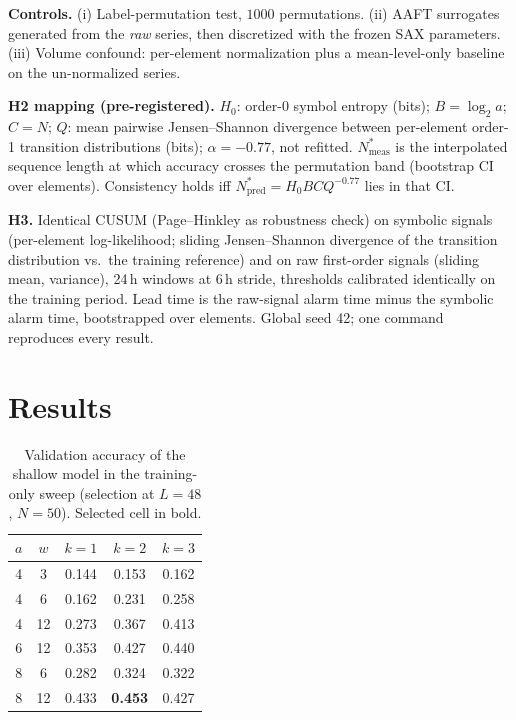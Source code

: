 \documentclass[conference]{IEEEtran}
\begin{document}
\textbf{Controls.} (i) Label-permutation test, $1000$ permutations. (ii) AAFT
surrogates generated from the \emph{raw} series, then discretized with the
frozen SAX parameters. (iii) Volume confound: per-element normalization plus a
mean-level-only baseline on the un-normalized series.

\textbf{H2 mapping (pre-registered).} $H_0$: order-0 symbol entropy (bits);
$B=\log_2 a$; $C=N$; $Q$: mean pairwise Jensen--Shannon divergence between
per-element order-1 transition distributions (bits); $\alpha=-0.77$, not
refitted. $N^\ast_{\text{meas}}$ is the interpolated sequence length at which
accuracy crosses the permutation band (bootstrap CI over elements). Consistency
holds iff $N^\ast_{\text{pred}}=H_0 B C Q^{-0.77}$ lies in that CI.

\textbf{H3.} Identical CUSUM (Page--Hinkley as robustness check) on symbolic
signals (per-element log-likelihood; sliding Jensen--Shannon divergence of the
transition distribution vs.\ the training reference) and on raw first-order
signals (sliding mean, variance), 24\,h windows at 6\,h stride, thresholds
calibrated identically on the training period. Lead time is the raw-signal
alarm time minus the symbolic alarm time, bootstrapped over elements. Global
seed 42; one command reproduces every result.

\section{Results}\label{sec:results}

\begin{table}[t]
\caption{Validation accuracy of the shallow model in the training-only sweep
(selection at $L{=}48$, $N{=}50$). Selected cell in bold.}
\label{tab:sweep}
\centering\small
\begin{tabular}{ccccc}
\toprule
$a$ & $w$ & $k{=}1$ & $k{=}2$ & $k{=}3$\\
\midrule
4 & 3 & 0.144 & 0.153 & 0.162\\
4 & 6 & 0.162 & 0.231 & 0.258\\
4 & 12 & 0.273 & 0.367 & 0.413\\
6 & 12 & 0.353 & 0.427 & 0.440\\
8 & 6 & 0.282 & 0.324 & 0.322\\
8 & 12 & 0.433 & \textbf{0.453} & 0.427\\
\bottomrule
\end{tabular}
\end{table}
\end{document}
